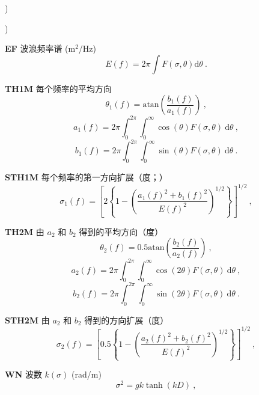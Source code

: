 \begin{list}{)\hfill}
\begin{list}{)\hfill}
\item \textbf{EF} 波浪频率谱 (m$^2$/Hz)
      \begin{equation} E(f) = 2 \pi  \int F(\sigma,\theta) \mathrm{d} \theta 
      \: . \label{eq:Ef} \end{equation}
\item \textbf{TH1M} 每个频率的平均方向 \citep[度；][]{art:KVH88}
       \begin{equation} \theta_1 (f)= \mbox{atan} \left ( \frac{b_1(f)}{a_1(f)} \right )
      \: , \label{eq:theta_b} \end{equation} \begin{equation}
      a_1(f) = 2 \pi \int_0^{2\pi} \int_0^\infty \cos(\theta) F(\sigma,\theta) \:
       \mathrm{d}\theta \: , \end{equation} \begin{equation}
      b_1(f) = 2 \pi \int_0^{2\pi} \int_0^\infty \sin(\theta) F(\sigma,\theta) \:
       \mathrm{d}\theta \: . \end{equation}
\item \textbf{STH1M} 每个频率的第一方向扩展（度；）
      \begin{equation} \sigma_1(f) = \left [ 2 \left \{ 1 - \left (
      \frac{a_1(f)^2+b_1(f)^2}{E(f)^2} \right )^{1/2} \right \} \right ]^{1/2}
      \: , \label{eq:sig_th1} \end{equation}
\item \textbf{TH2M} 由 $a_2$ 和 $b_2$ 得到的平均方向（度）
       \begin{equation} \theta_2 (f)= 0.5 \mbox{atan} \left ( \frac{b_2(f)}{a_2(f)} \right )
      \: , \label{eq:theta_2} \end{equation} \begin{equation}
      a_2(f) = 2 \pi \int_0^{2\pi} \int_0^\infty \cos(2 \theta) F(\sigma,\theta) \:
       \mathrm{d}\theta \: , \end{equation} \begin{equation}
      b_2(f) = 2 \pi \int_0^{2\pi} \int_0^\infty \sin(2 \theta) F(\sigma,\theta) \:
       \mathrm{d}\theta \: . \end{equation}
\item \textbf{STH2M} 由 $a_2$ 和 $b_2$ 得到的方向扩展（度）
      \begin{equation} \sigma_2(f) = \left [ 0.5 \left \{ 1 - \left (
      \frac{a_2(f)^2+b_2(f)^2}{E(f)^2} \right )^{1/2} \right \} \right ]^{1/2}
      \: , \label{eq:sig_th1} \end{equation}
\item \textbf{WN} 波数 $k(\sigma)$ (rad/m)
      \begin{equation} \sigma^2 = g k \tanh (k D) 
      \: , \label{eq:k} \end{equation}
\end{list}


\end{list}
